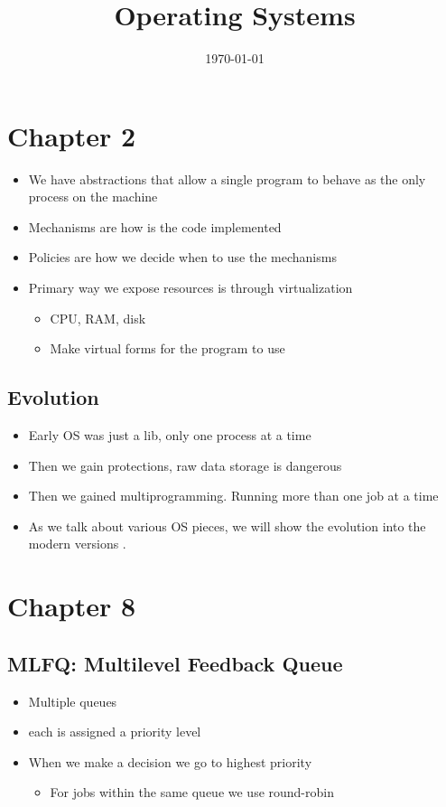\documentclass[11pt]{article}
\date{\today}
\title{Operating Systems}
\begin{document}
\maketitle
\tableofcontents

\section{Chapter 2}
\label{sec:org5991405}
\begin{itemize}
\item We have abstractions that allow a single program to behave as the only process on the machine
\item Mechanisms are how is the code implemented
\item Policies are how we decide when to use the mechanisms
\item Primary way we expose resources is through virtualization
\begin{itemize}
\item CPU, RAM, disk
\item Make virtual forms for the program to use
\end{itemize}
\end{itemize}
\subsection{Evolution}
\label{sec:org3f2ef08}
\begin{itemize}
\item Early OS was just a lib, only one process at a time
\item Then we gain protections, raw data storage is dangerous
\item Then we gained multiprogramming. Running more than one job at a time
\item As we talk about various OS pieces, we will show the evolution into the modern versions .
\end{itemize}
\section{Chapter 8}
\label{sec:org86c543d}
\subsection{MLFQ: Multilevel Feedback Queue}
\label{sec:orgee9d062}
\begin{itemize}
\item Multiple queues
\item each is assigned a priority level
\item When we make a decision we go to highest priority
\begin{itemize}
\item For jobs within the same queue we use round-robin
\end{itemize}
\end{itemize}
\end{document}
